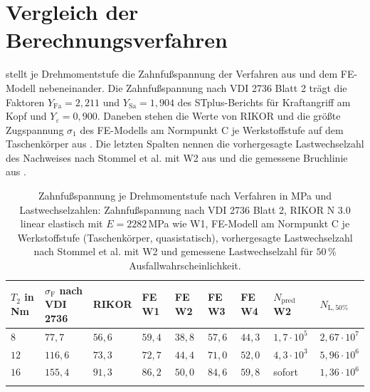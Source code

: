 \section{Vergleich der Berechnungsverfahren}
\label{sec:verfahrensvergleich}

 stellt je Drehmomentstufe die Zahnfußspannung der Verfahren aus  und dem FE-Modell nebeneinander. Die Zahnfußspannung nach VDI 2736 Blatt 2 trägt die Faktoren $Y_{\mathrm{Fa}} = 2{,}211$ und $Y_{\mathrm{Sa}} = 1{,}904$ des STplus-Berichts für Kraftangriff am Kopf und $Y_{\varepsilon} = 0{,}900$. Daneben stehen die Werte von RIKOR und die größte Zugspannung $\sigma_{\mathrm{1}}$ des FE-Modells am Normpunkt C je Werkstoffstufe auf dem Taschenkörper aus . Die letzten Spalten nennen die vorhergesagte Lastwechselzahl des Nachweises nach Stommel et al. mit W2 aus  und die gemessene Bruchlinie aus .

\begin{table}[htbp]
	\caption{Zahnfußspannung je Drehmomentstufe nach Verfahren in MPa und Lastwechselzahlen: Zahnfußspannung nach VDI 2736 Blatt 2, RIKOR N 3.0 linear elastisch mit $E = 2282$\,MPa wie W1, FE-Modell am Normpunkt C je Werkstoffstufe (Taschenkörper, quasistatisch), vorhergesagte Lastwechselzahl nach Stommel et al. mit W2 und gemessene Lastwechselzahl für $50$\,\% Ausfallwahrscheinlichkeit.}
	\label{tab:verfahrensvergleich}
	\centering
	\footnotesize
	\setlength{\tabcolsep}{4pt}
	\begin{tabular}{L{1.0cm}L{1.6cm}L{1.2cm}L{1.0cm}L{1.0cm}L{1.0cm}L{1.0cm}L{1.7cm}L{1.7cm}}
		$T_{2}$ in Nm & $\sigma_{\mathrm{F}}$ nach VDI 2736 & RIKOR    & FE W1    & FE W2    & FE W3    & FE W4    & $N_{\mathrm{pred}}$ W2 & $N_{\mathrm{L},50\%}$ \\
		\hline
		$8$           & $77{,}7$                            & $56{,}6$ & $59{,}4$ & $38{,}8$ & $57{,}6$ & $44{,}3$ & $1{,}7 \cdot 10^{5}$   & $2{,}67 \cdot 10^{7}$ \\
		\hline
		$12$          & $116{,}6$                           & $73{,}3$ & $72{,}7$ & $44{,}4$ & $71{,}0$ & $52{,}0$ & $4{,}3 \cdot 10^{3}$   & $5{,}96 \cdot 10^{6}$ \\
		\hline
		$16$          & $155{,}4$                           & $91{,}3$ & $86{,}2$ & $50{,}0$ & $84{,}6$ & $59{,}8$ & sofort                 & $1{,}36 \cdot 10^{6}$ \\
		\hline
	\end{tabular}
\end{table}

